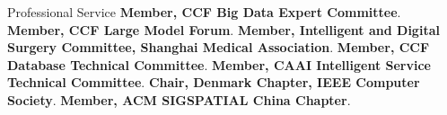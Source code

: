 \begin{rubric}{Professional Service}
\entry*[2026 -- present]%
	\textbf{Member, CCF Big Data Expert Committee}.
\entry*[2024 -- present]%
	\textbf{Member, CCF Large Model Forum}.
\entry*[2024 -- present]%
	\textbf{Member, Intelligent and Digital Surgery Committee, Shanghai Medical Association}.
\entry*[2023 -- present]%
	\textbf{Member, CCF Database Technical Committee}.
\entry*[2023 -- present]%
	\textbf{Member, CAAI Intelligent Service Technical Committee}.
\entry*[2022 -- present]%
	\textbf{Chair, Denmark Chapter, IEEE Computer Society}.
\entry*[2022 -- present]%
	\textbf{Member, ACM SIGSPATIAL China Chapter}.
\end{rubric}
